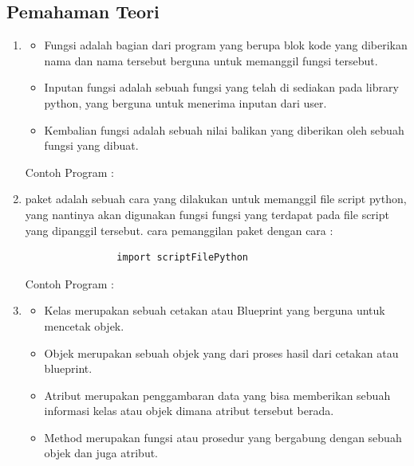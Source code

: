	\subsection{Pemahaman Teori}
		\begin{enumerate}
			\item	\begin{itemize}
						\item Fungsi adalah bagian dari program yang berupa blok kode yang diberikan nama dan nama tersebut berguna untuk memanggil fungsi tersebut.
					
						\item Inputan fungsi adalah sebuah fungsi yang telah di sediakan pada library python, yang berguna untuk menerima inputan dari user.
					
						\item Kembalian fungsi adalah sebuah nilai balikan yang diberikan oleh sebuah fungsi yang dibuat.
					\end{itemize}
					
					Contoh Program : 
					
					
			\item paket adalah sebuah cara yang dilakukan untuk memanggil file script python, yang nantinya akan digunakan fungsi fungsi yang terdapat pada file script yang dipanggil tersebut. cara pemanggilan paket dengan cara :
				\begin{verbatim}
				import scriptFilePython
				\end{verbatim}
			
			Contoh Program :
			
			
			\item	\begin{itemize}
						\item Kelas merupakan sebuah cetakan atau Blueprint yang berguna untuk mencetak objek.
						
						\item Objek merupakan sebuah objek yang dari proses hasil dari cetakan atau blueprint.
						
						\item Atribut merupakan penggambaran data yang bisa memberikan sebuah informasi kelas atau objek dimana atribut tersebut berada.
						
						\item Method merupakan fungsi atau prosedur yang bergabung dengan sebuah objek dan juga atribut.
					\end{itemize}
					

\end{enumerate}
